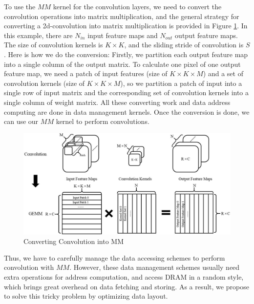 \documentclass{acm_proc_article-sp-copy}
\begin{document}
\vspace{-10pt}To use the $MM$ kernel for the convolution layers, we need to convert the convolution operations into matrix multiplication, and the general strategy for converting a 2d-convolution into matrix multiplication is provided in Figure \ref{convert}. In this example, there are $N_{in}$ input feature maps and $N_{out}$ output feature maps. The size of convolution kernels is $K\times K$, and the sliding stride of convolution is $S$. Here is how we do the conversion: Firstly, we partition each output feature map into a single column of the output matrix. To calculate one pixel of one output feature map, we need a patch of input features (size of $K\times K\times M$) and a set of convolution kernels (size of $K\times K\times M$), so we partition a patch of input into a single row of input matrix and the corresponding set of convolution kernels into a single column of weight matrix. All these converting work and data address computing are done in data management kernels. Once the conversion is done,  we can use our $MM$ kernel to perform convolutions.

\begin{figure}
	\centering
	\includegraphics[width=1.0\linewidth]{./figure/convert.jpg}
	\caption{Converting Convolution into MM}
	\label{convert}
\end{figure}

Thus, we have to carefully manage the data accessing schemes to perform convolution with $MM$. However, these data management schemes usually need extra operations for address computation, and access DRAM in a random style, which brings great overhead on data fetching and storing. As a result, we propose to solve this tricky problem by optimizing data layout.
\end{document}
